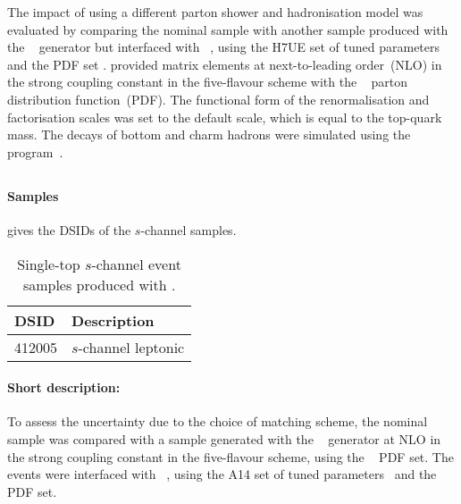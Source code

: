 The impact of using a different parton shower and hadronisation model was evaluated by comparing the nominal sample
with another sample produced with the \POWHEGBOX[v2]~\cite{Alioli:2009je,Nason:2004rx,Frixione:2007vw,Alioli:2010xd}
generator but interfaced with \HERWIG[7.04]~\cite{Bahr:2008pv,Bellm:2015jjp}, using the H7UE set of
tuned parameters~\cite{Bellm:2015jjp} and the \MMHT[lo] PDF set \cite{Harland-Lang:2014zoa}.
\POWHEGBOX provided matrix elements at next-to-leading order~(NLO) in the strong coupling constant \alphas
in the five-flavour scheme with the \NNPDF[3.0nlo]~\cite{Ball:2014uwa} parton distribution function~(PDF).
The functional form of the renormalisation and factorisation scales was set to the default scale, which is equal to the top-quark mass.
The decays of bottom and charm hadrons were simulated using the \EVTGEN[1.6.0] program~\cite{Lange:2001uf}.


\subsection[MadGraph5\_aMC@NLO+Pythia8]{\MGNLOPY[8]}
\label{subsubsec:schan_aMCP8}

\paragraph{Samples}

 gives the DSIDs of the \(s\)-channel \MGNLOPY[8] samples.

\begin{table}[htbp]
  \caption{Single-top \(s\)-channel event samples produced with \MGNLOPY[8].}%
  \label{tab:schan_aMCP8}
  \centering
  \begin{tabular}{l l}
    \toprule
    DSID & Description \\
    \midrule
    412005 & \(s\)-channel leptonic \\
    \bottomrule
  \end{tabular}
\end{table}

\paragraph{Short description:}

To assess the uncertainty due to the choice of matching scheme, the nominal sample was compared with a sample generated
with the \MGNLO[2.6.2]~\cite{Alwall:2014hca} generator at NLO in the strong coupling constant \alphas in the five-flavour scheme,
using the \NNPDF[3.0nlo]~\cite{Ball:2014uwa} PDF set.
The events were interfaced with \PYTHIA[8.230]~\cite{Sjostrand:2014zea}, using the A14 set of tuned parameters~\cite{ATL-PHYS-PUB-2014-021}
and the \NNPDF[2.3lo] PDF set.



